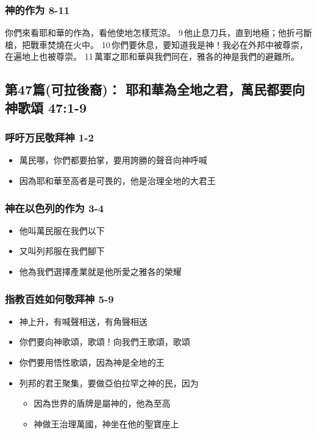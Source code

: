 \subsubsection{神的作为 8-11}
你們來看耶和華的作為，看他使地怎樣荒涼。
9 他止息刀兵，直到地極；他折弓斷槍，把戰車焚燒在火中。
10 你們要休息，要知道我是神！我必在外邦中被尊崇，在遍地上也被尊崇。
11 萬軍之耶和華與我們同在，雅各的神是我們的避難所。

\subsection{第47篇(可拉後裔)： 耶和華為全地之君，萬民都要向神歌頌 47:1-9}
\subsubsection{呼吁万民敬拜神 1-2}
\begin{itemize}
\itemsep-.45em  
\item 萬民哪，你們都要拍掌，要用誇勝的聲音向神呼喊
\item 因為耶和華至高者是可畏的，他是治理全地的大君王
\end{itemize}
\subsubsection{神在以色列的作为 3-4}
\begin{itemize}
\itemsep-.45em  
\item 他叫萬民服在我們以下
\item 又叫列邦服在我們腳下
\item 他為我們選擇產業就是他所愛之雅各的榮耀
\end{itemize}
\subsubsection{指教百姓如何敬拜神 5-9}
\begin{itemize}
\itemsep-.45em  
\item 神上升，有喊聲相送，有角聲相送
\item 你們要向神歌頌，歌頌！向我們王歌頌，歌頌
\item 你們要用悟性歌頌，因為神是全地的王
\item 列邦的君王聚集，要做亞伯拉罕之神的民，因为
\begin{itemize}
\itemsep-.45em  
\item 因為世界的盾牌是屬神的，他為至高
\item 神做王治理萬國，神坐在他的聖寶座上
\end{itemize}
\end{itemize}

